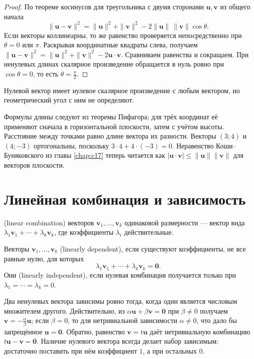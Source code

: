 \begin{proof}По теореме косинусов для треугольника с двумя сторонами \(\symbf u,\symbf v\) из общего начала
\[\|\symbf u-\symbf v\|^2=\|\symbf u\|^2+\|\symbf v\|^2-2\|\symbf u\|\,\|\symbf v\|\cos\theta.\]
Если векторы коллинеарны, то же равенство проверяется непосредственно при \(\theta=0\) или \(\pi\). Раскрывая координатные квадраты слева, получаем \(\|\symbf u-\symbf v\|^2=\|\symbf u\|^2+\|\symbf v\|^2-2\symbf u\cdot\symbf v\). Сравниваем равенства и сокращаем. При ненулевых длинах скалярное произведение обращается в нуль ровно при \(\cos\theta=0\), то есть \(\theta=\frac\pi2\).\end{proof}
Нулевой вектор имеет нулевое скалярное произведение с любым вектором, но геометрический угол с ним не определяют.

Формулы длины следуют из теоремы Пифагора; для трёх координат её применяют сначала в горизонтальной плоскости, затем с учётом высоты. Расстояние между точками равно длине вектора их разности. Векторы \((3;4)\) и \((4;-3)\) ортогональны, поскольку \(3\cdot4+4\cdot(-3)=0\). Неравенство Коши--Буняковского из главы \ref{chap:c17} теперь читается как \(|\symbf u\cdot\symbf v|\le\|\symbf u\|\|\symbf v\|\) для векторов плоскости.

\section{Линейная комбинация и зависимость}
\begin{definition}
 (linear combination) векторов \(\symbf v_1,\ldots,\symbf v_k\) одинаковой размерности — вектор вида \(\lambda_1\symbf v_1+\cdots+\lambda_k\symbf v_k\), где коэффициенты \(\lambda_i\) действительные.
\end{definition}
\begin{definition}
Векторы \(\symbf v_1,\ldots,\symbf v_k\)  (linearly dependent), если существуют коэффициенты, не все равные нулю, для которых
\[
\lambda_1\symbf v_1+\cdots+\lambda_k\symbf v_k=\symbf0.
\]
Они  (linearly independent), если нулевая комбинация получается только при \(\lambda_1=\cdots=\lambda_k=0\).
\end{definition}
Два ненулевых вектора зависимы ровно тогда, когда один является числовым множителем другого. Действительно, из \(\alpha\symbf u+\beta\symbf v=\symbf0\) при \(\beta\ne0\) получаем \(\symbf v=-\frac\alpha\beta\symbf u\); если \(\beta=0\), то для нетривиальной зависимости \(\alpha\ne0\), что дало бы запрещённое \(\symbf u=\symbf0\). Обратно, равенство \(\symbf v=t\symbf u\) даёт нетривиальную комбинацию \(t\symbf u-\symbf v=\symbf0\). Наличие нулевого вектора всегда делает набор зависимым: достаточно поставить при нём коэффициент \(1\), а при остальных \(0\).


